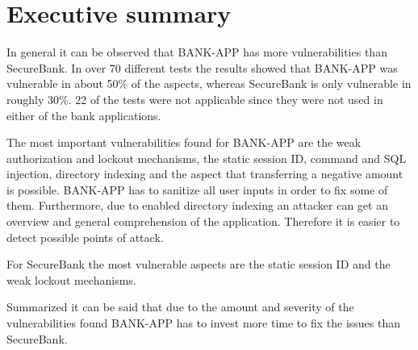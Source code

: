 \chapter{Executive summary}
In general it can be observed that BANK-APP has more vulnerabilities than SecureBank. In over 70 different tests the results showed that BANK-APP was vulnerable in about 50\% of the aspects, whereas SecureBank is only vulnerable in roughly 30\%. 22 of the tests were not applicable since they were not used in either of the bank applications.

The most important vulnerabilities found for BANK-APP are the weak authorization and lockout mechanisms, the static session ID, command and SQL injection, directory indexing and the aspect that transferring a negative amount is possible. BANK-APP has to sanitize all user inputs in order to fix some of them. Furthermore, due to enabled directory indexing an attacker can get an overview and general comprehension of the application. Therefore it is easier to detect possible points of attack.

For SecureBank the most vulnerable aspects are the static session ID and the weak lockout mechanisms.

Summarized it can be said that due to the amount and severity of the vulnerabilities found BANK-APP has to invest more time to fix the issues than SecureBank.